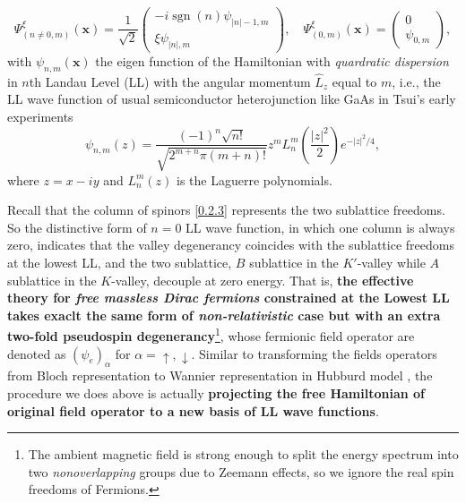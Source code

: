 \documentclass[bachelor,english,numbers]{ustcthesis}
\begin{document}
		\begin{equation}\label{0.2.3}
			\Psi^\xi_{(n\neq0,m)}(\bm{x})=\dfrac{1}{\sqrt{2}}\left(\begin{array}{c}
				-i\mathop{\mathrm{sgn}}{(n)}\psi_{|n|-1,m}\\
				\xi\psi_{|n|,m}
			\end{array}\right),\quad\Psi^\xi_{(0,m)}(\bm{x})=\left(\begin{array}{c}
				0\\
				\psi_{0,m}
			\end{array}\right),
		\end{equation}
		with $\psi_{n,m}(\bm{x})$ the eigen function of the Hamiltonian with \emph{quardratic dispersion} in $n$th Landau Level (LL) with the angular momentum $\hat{L}_z$ equal to $m$, i.e., the LL wave function of usual semiconductor heterojunction like GaAs in Tsui's early experiments \cite{tsui1982two,tHoke20074}
		\begin{equation*}
			\psi_{n,m}(z)=\dfrac{(-1)^n\sqrt{n!}}{\sqrt{2^{m+n}\pi (m+n)!}}z^m L_n^m\left(\dfrac{|z|^2}{2}\right)e^{-|z|^2/4},
		\end{equation*}
		where $z=x-iy$ and $L_n^m(z)$ is the Laguerre polynomials.\par
		Recall that the column of spinors \eqref{0.2.3} represents the two sublattice freedoms. So the distinctive form of $n=0$ LL wave function, in which one column is always zero, indicates that the valley degenerancy coincides with the sublattice freedoms at the lowest LL, and the two sublattice, $B$ sublattice in the $K'$-valley while $A$ sublattice in the $K$-valley, decouple at zero energy. That is, {\bf the effective theory for \emph{free massless Dirac fermions} constrained at the Lowest LL takes exaclt the same form of \emph{non-relativistic} case but with an extra two-fold pseudospin degenerancy}\footnote{The ambient magnetic field is strong enough to split the energy spectrum into two \emph{nonoverlapping} groups due to Zeemann effects, so we ignore the real spin freedoms of Fermions.}, whose fermionic field operator are denoted as $(\psi_e)_\alpha$ for $\alpha=\uparrow,\downarrow$. Similar to transforming the fields operators from Bloch representation to Wannier representation in Hubburd model \cite{nagaosa1999quantum}, the procedure we does above is actually {\bf projecting the free Hamiltonian of original field operator to a new basis of LL wave functions}.\par
	
\end{document}
